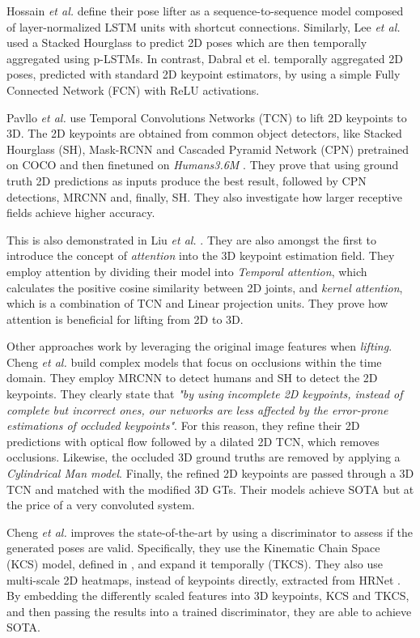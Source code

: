 \documentclass[letterpaper]{article}
\begin{document}
Hossain \textit{et al.} \cite{hossain18} define their pose lifter as a sequence-to-sequence model composed of layer-normalized LSTM units with shortcut connections. Similarly, Lee \textit{et al.} \cite{lee18} used a Stacked Hourglass \cite{newell16} to predict 2D poses which are then temporally aggregated using p-LSTMs. In contrast, Dabral et el. \cite{dabral18} temporally aggregated 2D poses, predicted with standard 2D keypoint estimators, by using a simple Fully Connected Network (FCN) with ReLU activations.

Pavllo \textit{et al.} \cite{pavllo19} use Temporal Convolutions Networks (TCN) to lift 2D keypoints to 3D. The 2D keypoints are obtained from common object detectors, like Stacked Hourglass (SH), Mask-RCNN \cite{he17} and Cascaded Pyramid Network (CPN) \cite{chen18} pretrained on COCO \cite{lin14} and then finetuned on \textit{Humans3.6M} \cite{ionescu13}. They prove that using ground truth 2D predictions as inputs produce the best result, followed by CPN detections, MRCNN and, finally, SH. They also investigate how larger receptive fields achieve higher accuracy.


This is also demonstrated in Liu \textit{et al.} \cite{liu20}. They are also amongst the first to introduce the concept of \textit{attention} into the 3D keypoint estimation field. They employ attention by dividing their model into \textit{Temporal attention}, which calculates the positive cosine similarity between 2D joints, and \textit{kernel attention}, which is a combination of TCN and Linear projection units. They prove how attention is beneficial for lifting from 2D to 3D. 

Other approaches work by leveraging the original image features when \textit{lifting}. Cheng \textit{et al.} \cite{cheng19} build complex models that focus on occlusions within the time domain. They employ MRCNN to detect humans and SH to detect the 2D keypoints. They clearly state that \textit{"by using incomplete 2D keypoints, instead of complete but incorrect ones, our networks are less affected by the error-prone estimations of occluded keypoints"}. For this reason, they refine their 2D predictions with optical flow followed by a dilated 2D TCN, which removes occlusions. Likewise, the occluded 3D ground truths are removed by applying a \textit{Cylindrical Man model}. Finally, the refined 2D keypoints are passed through a 3D TCN and matched with the modified 3D GTs. Their models achieve SOTA but at the price of a very convoluted system. 

Cheng \textit{et al.} \cite{cheng20} improves the state-of-the-art by using a discriminator to assess if the generated poses are valid. Specifically, they use the Kinematic Chain Space (KCS) model, defined in \cite{wandt19}, and expand it temporally (TKCS). They also use multi-scale 2D heatmaps, instead of keypoints directly, extracted from HRNet \cite{sun19}. By embedding the differently scaled features into 3D keypoints, KCS and TKCS, and then passing the results into a trained discriminator, they are able to achieve SOTA.
\\
\end{document}
